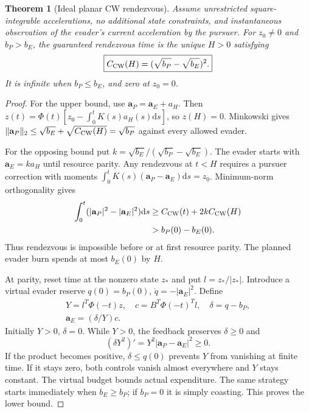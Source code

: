 \documentclass[journal,a4paper]{IEEEtran}
\newtheorem{theorem}{Theorem}
\newcommand{\dd}{\mathrm d}
\begin{document}
\begin{theorem}[Ideal planar CW rendezvous]
\label{thm:CW}
Assume unrestricted square-integrable accelerations, no additional state
constraints, and instantaneous observation of the evader's current
acceleration by the pursuer. For $z_0\ne0$ and $b_P>b_E$, the guaranteed
rendezvous time is the unique $H>0$ satisfying
\begin{equation}
 \boxed{C_{\rm CW}(H)=(\sqrt{b_P}-\sqrt{b_E})^2.}
\end{equation}
It is infinite when $b_P\le b_E$, and zero at $z_0=0$.
\end{theorem}
\begin{proof}
For the upper bound, use $\mathbf a_P=\mathbf a_E+a_H$.
Then $z(t)=\Phi(t)[z_0-\int_0^tK(s)a_H(s)\dd s]$, so $z(H)=0$.
Minkowski gives $\|\mathbf a_P\|_2\le\sqrt{b_E}+\sqrt{C_{\rm CW}(H)}
=\sqrt{b_P}$ against every allowed evader.

For the opposing bound put $k=\sqrt{b_E}/(\sqrt{b_P}-\sqrt{b_E})$.
The evader starts with $\mathbf a_E=ka_H$ until resource parity.
Any rendezvous at $t<H$ requires a pursuer correction with moments
$\int_0^tK(s)(\mathbf a_P-\mathbf a_E)\dd s=z_0$.
Minimum-norm orthogonality gives
\begin{equation}
\begin{split}
 \int_0^t(|\mathbf a_P|^2-|\mathbf a_E|^2)\dd s
 &\ge C_{\rm CW}(t)+2kC_{\rm CW}(H)\\
 &>b_P(0)-b_E(0).
\end{split}
\end{equation}
Thus rendezvous is impossible before or at first resource parity.
The planned evader burn spends at most $b_E(0)$ by $H$.

At parity, reset time at the nonzero state $z_*$ and put
$l=z_*/|z_*|$. Introduce a virtual evader reserve $q(0)=b_P(0)$,
$\dot q=-|\mathbf a_E|^2$. Define
\begin{equation}
\begin{gathered}
 Y=l^T\Phi(-t)z,\quad c=B^T\Phi(-t)^Tl,\quad\delta=q-b_P,\\
 \mathbf a_E=(\delta/Y)c.
\end{gathered}
\label{eq:CWparity}
\end{equation}
Initially $Y>0$, $\delta=0$. While $Y>0$, the feedback preserves
$\delta\ge0$ and
\begin{equation}
 (\delta Y^2)'=Y^2|\mathbf a_P-\mathbf a_E|^2\ge0.
\end{equation}
If the product becomes positive, $\delta\le q(0)$ prevents $Y$ from
vanishing at finite time. If it stays zero, both controls vanish almost
everywhere and $Y$ stays constant. The virtual budget bounds actual
expenditure. The same strategy starts immediately when $b_E\ge b_P$;
if $b_P=0$ it is simply coasting. This proves the lower bound.
\end{proof}
\end{document}
